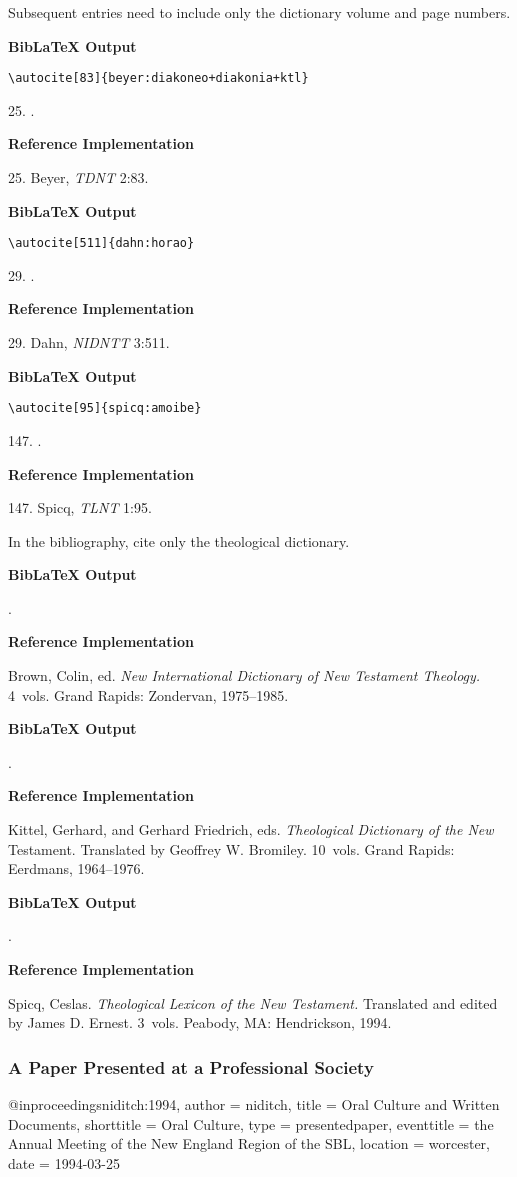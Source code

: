 \documentclass[a4paper]{article}
\newcommand\citetestlexns[3]{%
  {\textbf{BibLaTeX Output}\par
   \nobreak
   \texttt{\textbackslash autocite[#2]\{#3\}}\par
   \color{biblatex-colour}
   #1. \cite[#2]{#3}.\par}}
\newcommand\citetestbib[1]{%
  {\textbf{BibLaTeX Output}\par
   \nobreak
   \color{biblatex-colour}
   \hangindent\bibindent\bibentrycite{#1}.\par}}
\newenvironment{refimp}{%
  \begin{minipage}{\linewidth}
    \setlength{\parskip}{1ex}
    \textbf{Reference Implementation}\par
    \nobreak
    \color{reference-colour}
}{\end{minipage}}
\newenvironment{vb}{%
  \setlength{\parskip}{0pt}
  \verbatim}{\endverbatim}
\begin{document}
\bigskip

Subsequent entries need to include only the dictionary volume and page
numbers.

\citetestlexns{25}{83}{beyer:diakoneo+diakonia+ktl}

\begin{refimp}
  25. Beyer, \emph{TDNT} 2:83.
\end{refimp}

\citetestlexns{29}{511}{dahn:horao}

\begin{refimp}
  29. Dahn, \emph{NIDNTT} 3:511.
\end{refimp}

\citetestlexns{147}{95}{spicq:amoibe}

\begin{refimp}
  147. Spicq, \emph{TLNT} 1:95.
\end{refimp}

\bigskip

In the bibliography, cite only the theological dictionary.

\citetestbib{NIDNTT}

\begin{refimp}
  \hangindent\bibindent Brown, Colin, ed. \emph{New International Dictionary
  of New Testament Theology.} 4~vols. Grand Rapids: Zondervan, 1975–1985.
\end{refimp}

\citetestbib{TDNT}

\begin{refimp}
  \hangindent\bibindent Kittel, Gerhard, and Gerhard Friedrich, eds.
  \emph{Theological Dictionary of the New} Testament. Translated by Geoffrey
  W. Bromiley. 10~vols. Grand Rapids: Eerdmans, 1964–1976.
\end{refimp}

\citetestbib{TLNT}

\begin{refimp}
  \hangindent\bibindent Spicq, Ceslas. \emph{Theological Lexicon of the New
  Testament.} Translated and edited by James D. Ernest. 3~vols. Peabody, MA:
  Hendrickson, 1994.
\end{refimp}

\subsubsection{A Paper Presented at a Professional Society}

\begin{vb}
@inproceedings{niditch:1994,
  author = niditch,
  title = {Oral Culture and Written Documents},
  shorttitle = {Oral Culture},
  type = {presentedpaper},
  eventtitle = {the Annual Meeting of the New England Region
                of the SBL},
  location = worcester,
  date = {1994-03-25}
}
\end{vb}
\end{document}
